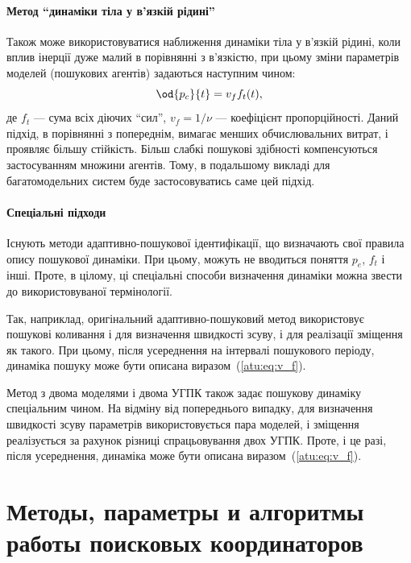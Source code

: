 \paragraph{Метод ``динаміки тіла у в'язкій рідині''}

Також може використовуватися наближення динаміки тіла у в'язкій рідині, коли
вплив інерції дуже малий в порівнянні з в'язкістю, при цьому зміни параметрів
моделей (пошукових агентів) задаються наступним чином:
%
\begin{equation}
  \od{p_c}{t} = v_f f_t(t),
  \label{atu:eq:v_f}
\end{equation}
%
\noindent
де $f_t$ --- сума всіх діючих ``сил'',
$v_f = 1 / \nu$ --- коефіцієнт
пропорційності. Даний підхід, в порівнянні з попереднім, вимагає менших
обчислювальних витрат, і проявляє більшу стійкість. Більш слабкі пошукові
здібності компенсуються застосуванням множини агентів. Тому, в подальшому
викладі для багатомодельних систем буде застосовуватись саме цей підхід.

\paragraph{Спеціальні підходи}

Існують методи адаптивно-пошукової ідентифікації, що визначають
свої правила опису пошукової динаміки. При цьому, можуть не
вводиться поняття
$ p_e $,
$ f_t $ і інші. Проте, в цілому, ці спеціальні способи визначення
динаміки можна звести до використовуваної термінології.

Так, наприклад, оригінальний адаптивно-пошуковий метод
використовує пошукові коливання і для визначення швидкості
зсуву, і для реалізації зміщення як такого. При цьому, після
усереднення на інтервалі пошукового періоду, динаміка пошуку
може бути описана виразом~(\ref{atu:eq:v_f}).

Метод з двома моделями і двома УГПК також задає пошукову
динаміку спеціальним чином. На відміну від попереднього випадку,
для визначення швидкості зсуву параметрів використовується
пара моделей, і зміщення реалізується за рахунок різниці
спрацьовування двох УГПК. Проте, і це разі, після усереднення,
динаміка може бути описана виразом~(\ref{atu:eq:v_f}).








\section{Методы, параметры и алгоритмы работы поисковых координаторов}  %

